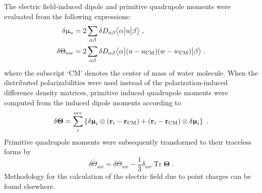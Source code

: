 \documentclass[aip,amsmath,amssymb,reprint,floatfix]{revtex4-1}
\newcommand{\tbraket}[3]{\ensuremath{\bigl\langle {#1} \bigl\lvert {#2} \bigl\lvert {#3} \bigr\rangle}}
\newcommand{\BM}[1]{\bm{#1}}
\DeclareMathOperator{\Tr}{Tr}
\begin{document}
The electric field\hyp{}induced dipole and primitive quadrupole moments were evaluated from the following expressions:
%
\begin{subequations}\label{e:dmult}
  \begin{align}
   \delta \upmu_{u}   &= 2\sum_{\alpha\beta} \delta D_{\alpha\beta} \tbraket{\alpha}{u}{\beta}  \;,\\
   \delta \Theta_{uw} &= 2\sum_{\alpha\beta} \delta D_{\alpha\beta} \tbraket{\alpha}{(u-u_{\rm CM})(w-w_{\rm CM})}{\beta} \;. 
  \end{align}
\end{subequations}
%
where the subscript `CM' denotes the center of mass of water molecule.
When the distributed polarizabilities were used instead of the polarization\hyp{}induced 
difference density matrices, primitive induced quadrupole moments were computed from
the induced dipole moments according to
%
\begin{equation}
  \delta {\BM \Theta} = \sum_i^{\rm occ} 
   \left\{ 
       \delta {\BM \upmu}_i \otimes \left( {\bf r}_i - {\bf r}_{\rm CM} \right) 
      + \left( {\bf r}_i - {\bf r}_{\rm CM} \right) \otimes \delta {\BM \upmu}_i
   \right\} \;.
\end{equation}
%
Primitive quadrupole moments were subsequently transformed to their traceless forms by
%
\begin{equation}
  \delta \widetilde{\Theta}_{uw} = \delta \Theta_{uw} - \frac{1}{3} \delta_{uw} \Tr{\BM\Theta} \;.
\end{equation}
%
Methodology for the calculation of the electric field due to point charges
can be found elsewhere.\cite{Blasiak.Cho.JCP.2014}
\end{document}
